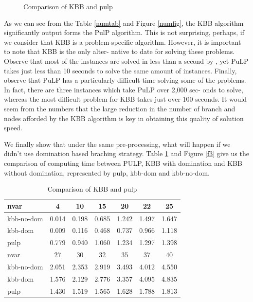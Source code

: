 \documentclass[a4paper,11pt]{article}
\begin{document}
\begin{figure}[H]
\begin{center}
\end{center}
\caption{Comparison of KBB and pulp \label{numfigp}}
\end{figure}

As we can see from the Table \ref{numtab} and Figure \ref{numfig}, the KBB algorithm significantly output forms the PulP algorithm. This is not surprising, perhaps, if we consider that KBB is a problem-specific algorithm. However, it is important to note that KBB is the only alter- native to date for solving these problems. Observe that most of the instances are solved in less than a second by , yet PuLP takes just less than 10 seconds to solve the same amount of instances. Finally, observe that PuLP has a particularly difficult time solving some of the problems. In fact, there are three instances which take PuLP over 2,000 sec- onds to solve, whereas the most difficult problem for KBB takes just over 100 seconds. It would seem from the numbers that the large reduction in the number of branch and nodes afforded by the KBB algorithm is key in obtaining this quality of solution speed.

We finally show that under the same pre-processing, what will happen if we didn't use domination based braching strategy. Table \ref{t4} and Figure \ref{f3} give us the comparison of computing time between PULP, KBB with domination and KBB without domination, represented by pulp, kbb-dom and kbb-no-dom.

\begin{table}[H]
\begin{center}
\begin{tabular}{l c c c c c c}
\hline
nvar&4&10&15&20&22&25\\
\hline
kbb-no-dom&0.014&0.198&0.685&1.242&1.497 &1.647\\
kbb-dom&0.009&0.116&0.468&0.737&0.966&1.118\\
pulp&0.779&0.940&1.060&1.234&1.297&1.398\\
\hline\hline
nvar&27&30&32&35&37&40\\
\hline
kbb-no-dom&2.051&2.353&2.919&3.493&4.012&4.550\\
kbb-dom&1.576&2.129&2.776&3.357&4.095&4.835\\
pulp&1.430&1.519&1.565&1.628&1.788&1.813\\
\hline
\end{tabular}
\end{center}
\caption{Comparison of KBB and pulp\label{t4}}
\end{table}
\end{document}

